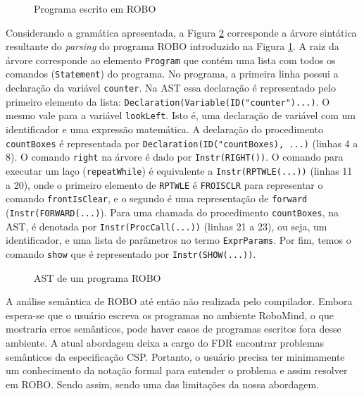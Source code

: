 \begin{figure}[!h]
\caption{Programa escrito em ROBO}

\label{fig:roboprogram}
\end{figure}

Considerando a gramática apresentada, a Figura \ref{fig:ast1} corresponde a árvore sintática resultante do \textit{parsing} do programa ROBO introduzido na Figura \ref{fig:roboprogram}. A raiz da árvore corresponde ao elemento \texttt{Program} que contém uma lista com todos os comandos (\texttt{Statement}) do programa. No programa, a primeira linha possui a declaração da variável \texttt{counter}. Na AST essa declaração é representado pelo primeiro elemento da lista: \texttt{Declaration(Variable(ID("counter")...)}. O mesmo vale para a variável \texttt{lookLeft}. Isto é, uma declaração de variável com um identificador e uma expressão matemática. A declaração do procedimento \texttt{countBoxes} é representada por \texttt{Declaration(ID("countBoxes), ...)} (linhas 4 a 8). O comando \texttt{right} na árvore é dado por \texttt{Instr(RIGHT())}. O comando para executar um laço (\texttt{repeatWhile}) é equivalente a \texttt{Instr(RPTWLE(...))} (linhas 11 a 20), onde o primeiro elemento de \texttt{RPTWLE} é \texttt{FROISCLR} para representar o comando \texttt{frontIsClear}, e o segundo é uma representação de \texttt{forward} (\texttt{Instr(FORWARD(...)}). Para uma chamada do procedimento \texttt{countBoxes}, na AST, é denotada por \texttt{Instr(ProcCall(...))} (linhas 21 a 23), ou seja, um identificador, e uma lista de parâmetros no termo \texttt{ExprParams}. Por fim, temos o comando \texttt{show} que é representado por \texttt{Instr(SHOW(...))}.

\begin{figure}[!h]
\centering
\caption{AST de um programa ROBO}

\label{fig:ast1}
\end{figure}

A análise semântica de ROBO até então não realizada pelo compilador. Embora espera-se que o usuário escreva os programas no ambiente RoboMind, o que mostraria erros semânticos, pode haver casos de programas escritos fora desse ambiente. A atual abordagem deixa a cargo do FDR encontrar problemas semânticos da especificação CSP. Portanto, o usuário precisa ter minimamente um conhecimento da notação formal para entender o problema e assim resolver em ROBO. Sendo assim, sendo uma das limitações da nossa abordagem.

